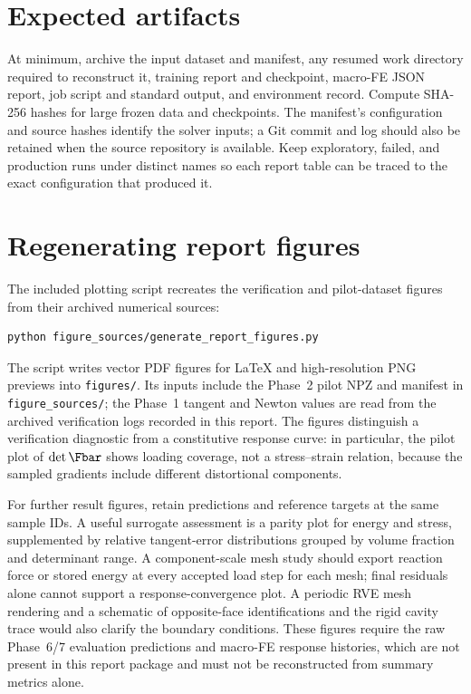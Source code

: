 \section{Expected artifacts}

At minimum, archive the input dataset and manifest, any resumed work
directory required to reconstruct it, training report and checkpoint,
macro-FE JSON report, job script and standard output, and environment
record. Compute SHA-256 hashes for large frozen data and checkpoints. The
manifest's configuration and source hashes identify the solver inputs; a
Git commit and log should also be retained when the source repository is
available. Keep exploratory, failed, and production runs under distinct
names so each report table can be traced to the exact configuration that
produced it.

\section{Regenerating report figures}

The included plotting script recreates the verification and pilot-dataset
figures from their archived numerical sources:
\begin{lstlisting}[language=bash]
python figure_sources/generate_report_figures.py
\end{lstlisting}
The script writes vector PDF figures for LaTeX and high-resolution PNG
previews into \texttt{figures/}. Its inputs include the Phase~2 pilot NPZ and
manifest in \texttt{figure\_sources/}; the Phase~1 tangent and Newton values
are read from the archived verification logs recorded in this report. The
figures distinguish a verification diagnostic from a constitutive response
curve: in particular, the pilot plot of \(\det\Fbar\) shows loading coverage,
not a stress--strain relation, because the sampled gradients include
different distortional components.

For further result figures, retain predictions and reference targets at the
same sample IDs. A useful surrogate assessment is a parity plot for energy
and stress, supplemented by relative tangent-error distributions grouped by
volume fraction and determinant range. A component-scale mesh study should
export reaction force or stored energy at every accepted load step for each
mesh; final residuals alone cannot support a response-convergence plot. A
periodic RVE mesh rendering and a schematic of opposite-face identifications
and the rigid cavity trace would also clarify the boundary conditions. These
figures require the raw Phase~6/7 evaluation predictions and macro-FE
response histories, which are not present in this report package and must
not be reconstructed from summary metrics alone.
